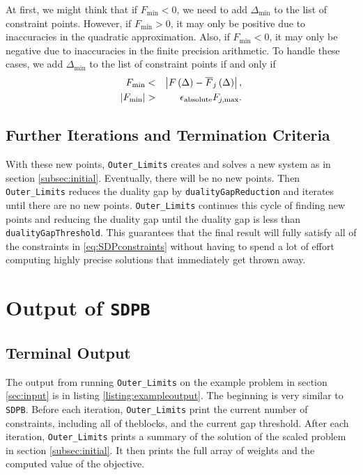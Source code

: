 \documentclass[12pt]{article}
\numberwithin{equation}{section}
\newcommand\SDPB{\texttt{SDPB}}
\begin{document}
At first, we might think that if $F_{\min}<0$, we need to add
$\Delta_{\min}$ to the list of constraint points.  However, if
$F_{\min}>0$, it may only be positive due to inaccuracies in the
quadratic approximation.  Also, if $F_{\min}<0$, it may only be
negative due to inaccuracies in the finite precision arithmetic.  To
handle these cases, we add $\Delta_{\min}$ to the list of constraint
points if and only if
\begin{eqnarray}
  F_{\min} & < & \left| F\left(\Delta\right) - \overline{F}_j\left(\Delta\right) \right|, \\
  \left|F_{\min}\right| & > & \epsilon_{\rm{absolute}}F_{j,\max}.
\end{eqnarray}

\subsection{Further Iterations and Termination Criteria}
\label{subsec:furtheriterations}

With these new points, \texttt{Outer\_Limits} creates and solves a new
system as in section \ref{subsec:initial}.  Eventually, there will be
no new points.  Then \texttt{Outer\_Limits} reduces the duality gap by
\texttt{dualityGapReduction} and iterates until there are no new
points.  \texttt{Outer\_Limits} continues this cycle of finding new
points and reducing the duality gap until the duality gap is less than
\texttt{dualityGapThreshold}.  This guarantees that the final result
will fully satisfy all of the constraints in \ref{eq:SDPconstraints}
without having to spend a lot of effort computing highly precise
solutions that immediately get thrown away.


\section{Output of \SDPB}

\subsection{Terminal Output}

The output from running \texttt{Outer\_Limits} on the example problem
in section \ref{sec:input} is in listing
\ref{listing:exampleoutput}. The beginning is very similar to
\texttt{SDPB}.  Before each iteration, \texttt{Outer\_Limits} print
the current number of constraints, including all of theblocks, and the
current gap threshold.  After each iteration, \texttt{Outer\_Limits}
prints a summary of the solution of the scaled problem in section
\ref{subsec:initial}.  It then prints the full array of weights and
the computed value of the objective.
\end{document}
